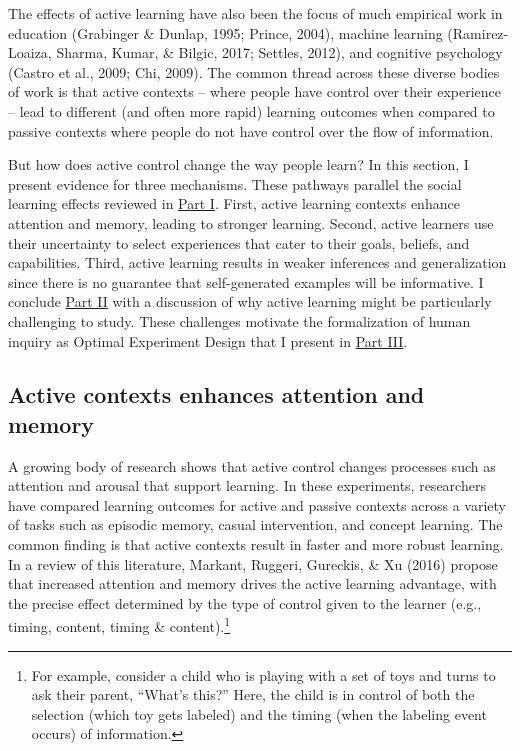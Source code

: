 \documentclass[oneside]{report}
\begin{document}
The effects of active learning have also been the focus of much
empirical work in education (Grabinger \& Dunlap, 1995; Prince, 2004),
machine learning (Ramirez-Loaiza, Sharma, Kumar, \& Bilgic, 2017;
Settles, 2012), and cognitive psychology (Castro et al., 2009; Chi,
2009). The common thread across these diverse bodies of work is that
active contexts -- where people have control over their experience --
lead to different (and often more rapid) learning outcomes when compared
to passive contexts where people do not have control over the flow of
information.

But how does active control change the way people learn? In this
section, I present evidence for three mechanisms. These pathways
parallel the social learning effects reviewed in
\protect\hyperlink{p1}{Part I}. First, active learning contexts enhance
attention and memory, leading to stronger learning. Second, active
learners use their uncertainty to select experiences that cater to their
goals, beliefs, and capabilities. Third, active learning results in
weaker inferences and generalization since there is no guarantee that
self-generated examples will be informative. I conclude
\protect\hyperlink{p2}{Part II} with a discussion of why active learning
might be particularly challenging to study. These challenges motivate
the formalization of human inquiry as Optimal Experiment Design that I
present in \protect\hyperlink{p3}{Part III}.

\hypertarget{active-contexts-enhances-attention-and-memory}{%
\subsection{Active contexts enhances attention and
memory}\label{active-contexts-enhances-attention-and-memory}}

A growing body of research shows that active control changes processes
such as attention and arousal that support learning. In these
experiments, researchers have compared learning outcomes for active and
passive contexts across a variety of tasks such as episodic memory,
casual intervention, and concept learning. The common finding is that
active contexts result in faster and more robust learning. In a review
of this literature, Markant, Ruggeri, Gureckis, \& Xu (2016) propose
that increased attention and memory drives the active learning
advantage, with the precise effect determined by the type of control
given to the learner (e.g., timing, content, timing \&
content).\footnote{For example, consider a child who is playing with a
  set of toys and turns to ask their parent, ``What's this?'' Here, the
  child is in control of both the selection (which toy gets labeled) and
  the timing (when the labeling event occurs) of information.}
\end{document}

